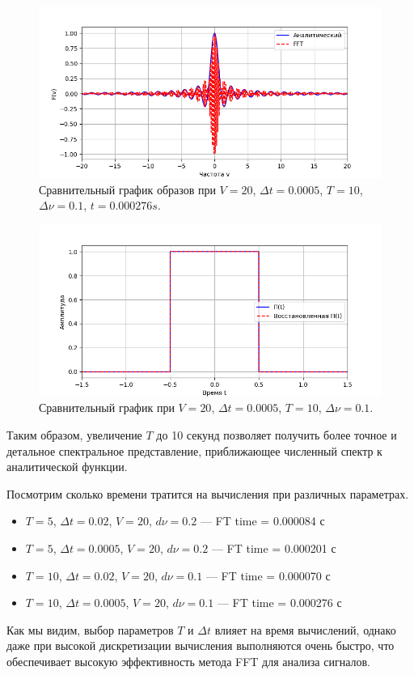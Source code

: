 \documentclass[a4paper]{article}
\begin{document}
\begin{figure}[H]
  \centering
  \includegraphics[width=\textwidth]{src/task_1_2/freq_10_0.0005_20_0.1.png}
  \caption{Сравнительный график образов при $V=20$, $\Delta t=0.0005$, $T=10$, $\Delta \nu=0.1$, $t=0.000276 s$.} 
\end{figure}
\begin{figure}[H]
  \centering
  \includegraphics[width=\textwidth]{src/task_1_2/time_10_0.0005_20_0.1.png}
  \caption{Сравнительный график при $V=20$, $\Delta t=0.0005$, $T=10$, $\Delta \nu=0.1$.} 
\end{figure}

\noindent Таким образом, увеличение $T$ до 10 секунд позволяет получить более точное и детальное спектральное представление, приближающее численный спектр к аналитической функции. 

Посмотрим сколько времени тратится на вычисления при различных параметрах.
\begin{itemize}
  \item $T=5$, $\Delta t=0.02$, $V=20$, $d\nu=0.2$ --- FT time = 0.000084 с
  \item $T=5$, $\Delta t=0.0005$, $V=20$, $d\nu=0.2$ --- FT time = 0.000201 с
  \item $T=10$, $\Delta t=0.02$, $V=20$, $d\nu=0.1$ --- FT time = 0.000070 с
  \item $T=10$, $\Delta t=0.0005$, $V=20$, $d\nu=0.1$ --- FT time = 0.000276 с
\end{itemize}
\noindent Как мы видим, выбор параметров $T$ и $\Delta t$ влияет на время вычислений, однако даже при высокой дискретизации вычисления выполняются очень быстро, что обеспечивает высокую эффективность метода FFT для анализа сигналов.
\end{document}

